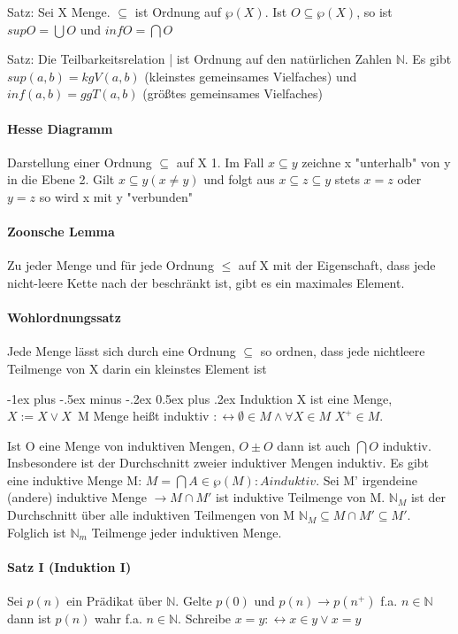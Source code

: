 \documentclass[10pt,landscape]{article}
\makeatletter
\renewcommand{\section}{\@startsection{section}{1}{0mm}%
                                {-1ex plus -.5ex minus -.2ex}%
                                {0.5ex plus .2ex}%
                                {\normalfont\large\bfseries}}
\makeatother
\begin{document}
\begin{multicols}{3}
Satz: Sei X Menge. $\subseteq$ ist Ordnung auf $\wp(X)$. Ist $O\subseteq \wp(X)$, so ist $sup O=\bigcup O$ und $inf O=\bigcap O$

Satz: Die Teilbarkeitsrelation | ist Ordnung auf den natürlichen Zahlen $\mathbb{N}$. Es gibt $sup(a,b)=kgV(a,b)$ (kleinstes gemeinsames Vielfaches) und $inf(a,b)=ggT(a,b)$ (größtes gemeinsames Vielfaches)

\paragraph{Hesse Diagramm}
Darstellung einer Ordnung $\subseteq$ auf X
1. Im Fall $x\subseteq y$ zeichne x "unterhalb" von y in die Ebene
2. Gilt $x\subseteq y (x\not = y)$ und folgt aus $x \subseteq z \subseteq y$ stets $x=z$ oder $y=z$ so wird x mit y "verbunden"

\paragraph{Zoonsche Lemma}
Zu jeder Menge und für jede Ordnung $\leq$ auf X mit der Eigenschaft, dass jede nicht-leere Kette nach der beschränkt ist, gibt es ein maximales Element.

\paragraph{Wohlordnungssatz}
Jede Menge lässt sich durch eine Ordnung $\subseteq$ so ordnen, dass jede nichtleere Teilmenge von X darin ein kleinstes Element ist

\section{Induktion}
X ist eine Menge, $X:=X\vee {X}$\
M Menge heißt induktiv $:\leftrightarrow \emptyset \in M \wedge \forall X \in M$  $X^+ \in M$.

Ist O eine Menge von induktiven Mengen, $O\pm O$ dann ist auch $\bigcap O$ induktiv. Insbesondere ist der Durchschnitt zweier induktiver Mengen induktiv. Es gibt eine induktive Menge M: $M =\bigcap {A \in \wp(M): A induktiv}$.
Sei M' irgendeine (andere) induktive Menge $\rightarrow M \cap M'$ ist induktive Teilmenge von M. $\mathbb{N}_M$ ist der Durchschnitt über alle induktiven Teilmengen von M $\mathbb{N}_M \subseteq M \cap M' \subseteq M'$. Folglich ist $\mathbb{N}_m$ Teilmenge jeder induktiven Menge.

\paragraph{Satz I (Induktion I)}
Sei $p(n)$ ein Prädikat über $\mathbb{N}$. Gelte $p(0)$ und $p(n)\rightarrow p(n^{+})$ f.a. $n\in \mathbb{N}$ dann ist $p(n)$ wahr f.a. $n \in \mathbb{N}$. Schreibe $x=y:\leftrightarrow x\in y \vee x=y$


\end{multicols}
\end{document}
